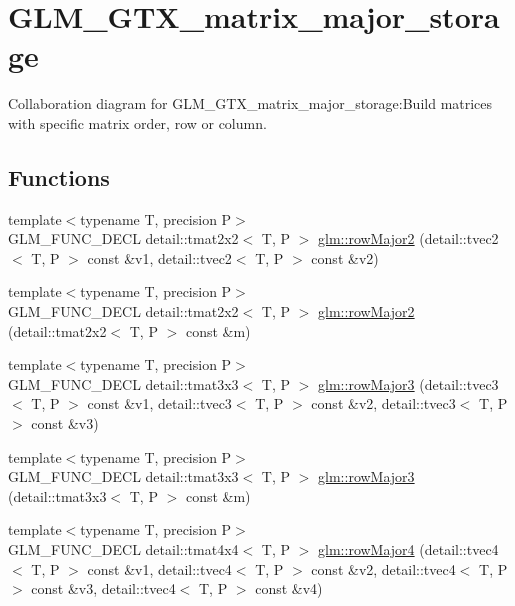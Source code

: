 \hypertarget{group__gtx__matrix__major__storage}{
\section{GLM\_\-GTX\_\-matrix\_\-major\_\-storage}
\label{group__gtx__matrix__major__storage}
}


Collaboration diagram for GLM\_\-GTX\_\-matrix\_\-major\_\-storage:Build matrices with specific matrix order, row or column.  
\subsection*{Functions}
\begin{CompactItemize}
\item 
{\footnotesize template$<$typename T, precision P$>$ }\\GLM\_\-FUNC\_\-DECL detail::tmat2x2$<$ T, P $>$ \hyperlink{group__gtx__matrix__major__storage_g9d48983329e8a94489982067dfe8f5cf}{glm::rowMajor2} (detail::tvec2$<$ T, P $>$ const \&v1, detail::tvec2$<$ T, P $>$ const \&v2)
\item 
{\footnotesize template$<$typename T, precision P$>$ }\\GLM\_\-FUNC\_\-DECL detail::tmat2x2$<$ T, P $>$ \hyperlink{group__gtx__matrix__major__storage_g9712bed19f3aa3776b59756adf3b56e2}{glm::rowMajor2} (detail::tmat2x2$<$ T, P $>$ const \&m)
\item 
{\footnotesize template$<$typename T, precision P$>$ }\\GLM\_\-FUNC\_\-DECL detail::tmat3x3$<$ T, P $>$ \hyperlink{group__gtx__matrix__major__storage_g3839659b9641777b1bbc98122efc1320}{glm::rowMajor3} (detail::tvec3$<$ T, P $>$ const \&v1, detail::tvec3$<$ T, P $>$ const \&v2, detail::tvec3$<$ T, P $>$ const \&v3)
\item 
{\footnotesize template$<$typename T, precision P$>$ }\\GLM\_\-FUNC\_\-DECL detail::tmat3x3$<$ T, P $>$ \hyperlink{group__gtx__matrix__major__storage_g292c13103d16ead7193def8fcbcfa9fb}{glm::rowMajor3} (detail::tmat3x3$<$ T, P $>$ const \&m)
\item 
{\footnotesize template$<$typename T, precision P$>$ }\\GLM\_\-FUNC\_\-DECL detail::tmat4x4$<$ T, P $>$ \hyperlink{group__gtx__matrix__major__storage_g8d22c54daf5c593c1285c54d1439eead}{glm::rowMajor4} (detail::tvec4$<$ T, P $>$ const \&v1, detail::tvec4$<$ T, P $>$ const \&v2, detail::tvec4$<$ T, P $>$ const \&v3, detail::tvec4$<$ T, P $>$ const \&v4)

\end{CompactItemize}
